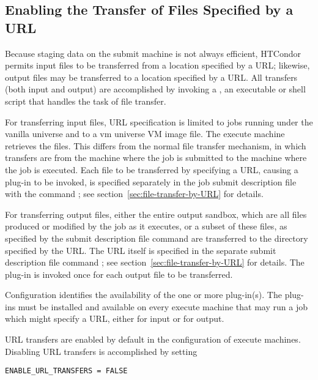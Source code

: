 \subsection{\label{sec:URL-transfer}
Enabling the Transfer of Files Specified by a URL}

Because staging data on the submit machine is not always efficient,
HTCondor permits input files to be transferred
from a location specified by a URL;
likewise, output files may be transferred
to a location specified by a URL.
All transfers (both input and output) are accomplished by invoking 
a ,
an executable or shell script that handles the task of file transfer.

For transferring input files,
URL specification is limited to jobs running under the vanilla universe 
and to a vm universe VM image file.
The execute machine retrieves the files.
This differs from the normal file transfer mechanism,
in which transfers are from the machine where the job is submitted
to the machine where the job is executed.
Each file to be transferred by specifying a URL, causing a
plug-in to be invoked, is specified separately in the job submit
description file with the command ;
see section~\ref{sec:file-transfer-by-URL} for details.

For transferring output files,
either the entire output sandbox, which are all files produced or
modified by the job as it executes, or a subset of these files,
as specified by the submit description file command 
 are transferred to the
directory specified by the URL.
The URL itself is specified in the separate submit description file command 
;
see section~\ref{sec:file-transfer-by-URL} for details.
The plug-in is invoked once for each output file to be transferred.

Configuration identifies the availability of the one or more plug-in(s).
The plug-ins must be installed and available on every execute machine 
that may run a job which might specify a URL, either for input or for output.

URL transfers are enabled by default in the configuration 
of execute machines.
Disabling URL transfers is accomplished by setting
\footnotesize
\begin{verbatim}
ENABLE_URL_TRANSFERS = FALSE
\end{verbatim}
\normalsize

